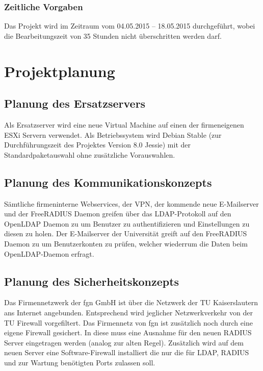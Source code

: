 \documentclass[11pt,a4paper,titlepage=firstiscover]{scrartcl} %
\begin{document}
\subsubsection{Zeitliche Vorgaben}
Das Projekt wird im Zeitraum vom 04.05.2015 – 18.05.2015 durchgef\"uhrt, wobei die Bearbeitungszeit von 35 Stunden nicht \"uberschritten werden darf.

\section{Projektplanung}
\subsection{Planung des Ersatzservers}
Als Ersatzserver wird eine neue Virtual Machine auf einen der firmeneigenen ESXi Servern verwendet. Als Betriebssystem wird Debian Stable (zur Durchf\"uhrungszeit des Projektes Version 8.0 Jessie) mit der Standardpaketauswahl ohne zus\"atzliche Vorauswahlen.

\subsection{Planung des Kommunikationskonzepts}
S\"amtliche firmeninterne Webservices, der VPN, der kommende neue E-Mailserver und der FreeRADIUS Daemon greifen \"uber das LDAP-Protokoll auf den OpenLDAP Daemon zu um Benutzer zu authentifizieren und Einstellungen zu diesen zu holen. Der E-Mailserver der Universit\"at greift auf den FreeRADIUS Daemon zu um Benutzerkonten zu pr\"ufen, welcher wiederrum die Daten beim OpenLDAP-Daemon erfragt.

\subsection{Planung des Sicherheitskonzepts}
Das Firmennetzwerk der fgn GmbH ist \"uber die Netzwerk der TU Kaiserslautern ans Internet angebunden. Entsprechend wird jeglicher Netzwerkverkehr von der TU Firewall vorgefiltert. Das Firmennetz von fgn ist zus\"atzlich noch durch eine eigene Firewall gesichert. In diese muss eine Ausnahme f\"ur den neuen RADIUS Server eingetragen werden (analog zur alten Regel). Zus\"atzlich wird auf dem neuen Server eine Software-Firewall installiert die nur die f\"ur LDAP, RADIUS und zur Wartung ben\"otigten Ports zulassen soll.
\end{document}
